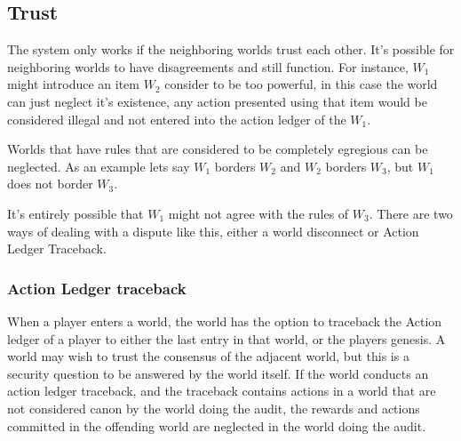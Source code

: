 \documentclass[runningheads,a4paper]{llncs}
\begin{document}
\subsection{Trust}
The system only works if the neighboring worlds trust each other. It's possible for neighboring worlds to have disagreements and still function. For instance, $W_1$ might introduce an item $W_2$ consider to be too powerful, in this case the world can just neglect it's existence, any action presented using that item would be considered illegal and not entered into the action ledger of the $W_1$.

Worlds that have rules that are considered to be completely egregious can be neglected. As an example lets say $W_1$ borders $W_2$ and $W_2$ borders $W_3$, but $W_1$ does not border $W_3$. 

\begin{center}

\end{center}

It's entirely possible that $W_1$ might not agree with the rules of $W_3$. There are two ways of dealing with a dispute like this, either a world disconnect or Action Ledger Traceback. 

\subsubsection{Action Ledger traceback}
When a player enters a world, the world has the option to traceback the Action ledger of a player to either the last entry in that world, or the players genesis. A world may wish to trust the consensus of the adjacent world, but this is a security question to be answered by the world itself. If the world conducts an action ledger traceback, and the traceback contains actions in a world that are not considered canon by the world doing the audit, the rewards and actions committed in the offending world are neglected in the world doing the audit.
\end{document}
